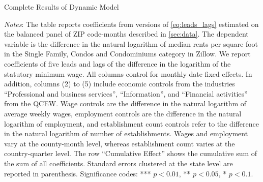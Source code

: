 \clearpage
\begin{table}[h!]
	\caption{Complete Results of Dynamic Model}
	\label{tab:dynamic_lags_leads_main}
	\centering
	
	\begin{minipage}{0.95\textwidth} \footnotesize
		\vspace{3mm} 
		\textit{Notes}: The table reports coefficients from versions of 
		\autoref{eq:leads_lags} estimated on the balanced panel of ZIP code-months
		described in \autoref{sec:data}. The dependent variable is the difference in 
		the natural logarithm of median	rents per square foot in the Single Family, Condos 
		and Condominiums category in Zillow. We report coefficients of five leads and lags 
		of the difference in the logarithm of the statutory minimum wage. All columns 
		control for monthly date fixed effects. In addition, columns (2) to (5) include 
		economic controls from the industries ``Professional and business services'', 
		``Information'', and ``Financial activities'' from the QCEW. Wage controls are 
		the difference in the natural logarithm of average weekly wages, employment 
		controls are the difference in the natural logarithm of employment, and 
		establishment count controls refer to the difference in the natural logarithm 
		of number of establishments. Wages and employment vary at the county-month level,
		whereas establishment count varies at the country-quarter level. The row 
		``Cumulative Effect'' shows the cumulative 	sum of the sum of all coefficients. 
		Standard errors clustered at the state level are reported in parenthesis. 
		Significance codes: *** $p < 0.01$, ** $p < 0.05$, * $p < 0.1$.
	\end{minipage}
\end{table}


